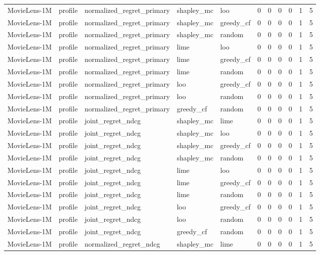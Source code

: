 \begin{table}[t]
{\begin{tabular}{lllllrrrrrr}
MovieLens-1M & profile & normalized\_regret\_primary & shapley\_mc & loo & 0 & 0 & 0 & 0 & 1 & 5 \\
MovieLens-1M & profile & normalized\_regret\_primary & shapley\_mc & greedy\_cf & 0 & 0 & 0 & 0 & 1 & 5 \\
MovieLens-1M & profile & normalized\_regret\_primary & shapley\_mc & random & 0 & 0 & 0 & 0 & 1 & 5 \\
MovieLens-1M & profile & normalized\_regret\_primary & lime & loo & 0 & 0 & 0 & 0 & 1 & 5 \\
MovieLens-1M & profile & normalized\_regret\_primary & lime & greedy\_cf & 0 & 0 & 0 & 0 & 1 & 5 \\
MovieLens-1M & profile & normalized\_regret\_primary & lime & random & 0 & 0 & 0 & 0 & 1 & 5 \\
MovieLens-1M & profile & normalized\_regret\_primary & loo & greedy\_cf & 0 & 0 & 0 & 0 & 1 & 5 \\
MovieLens-1M & profile & normalized\_regret\_primary & loo & random & 0 & 0 & 0 & 0 & 1 & 5 \\
MovieLens-1M & profile & normalized\_regret\_primary & greedy\_cf & random & 0 & 0 & 0 & 0 & 1 & 5 \\
MovieLens-1M & profile & joint\_regret\_ndcg & shapley\_mc & lime & 0 & 0 & 0 & 0 & 1 & 5 \\
MovieLens-1M & profile & joint\_regret\_ndcg & shapley\_mc & loo & 0 & 0 & 0 & 0 & 1 & 5 \\
MovieLens-1M & profile & joint\_regret\_ndcg & shapley\_mc & greedy\_cf & 0 & 0 & 0 & 0 & 1 & 5 \\
MovieLens-1M & profile & joint\_regret\_ndcg & shapley\_mc & random & 0 & 0 & 0 & 0 & 1 & 5 \\
MovieLens-1M & profile & joint\_regret\_ndcg & lime & loo & 0 & 0 & 0 & 0 & 1 & 5 \\
MovieLens-1M & profile & joint\_regret\_ndcg & lime & greedy\_cf & 0 & 0 & 0 & 0 & 1 & 5 \\
MovieLens-1M & profile & joint\_regret\_ndcg & lime & random & 0 & 0 & 0 & 0 & 1 & 5 \\
MovieLens-1M & profile & joint\_regret\_ndcg & loo & greedy\_cf & 0 & 0 & 0 & 0 & 1 & 5 \\
MovieLens-1M & profile & joint\_regret\_ndcg & loo & random & 0 & 0 & 0 & 0 & 1 & 5 \\
MovieLens-1M & profile & joint\_regret\_ndcg & greedy\_cf & random & 0 & 0 & 0 & 0 & 1 & 5 \\
MovieLens-1M & profile & normalized\_regret\_ndcg & shapley\_mc & lime & 0 & 0 & 0 & 0 & 1 & 5 \\

\end{tabular}}
\end{table}
